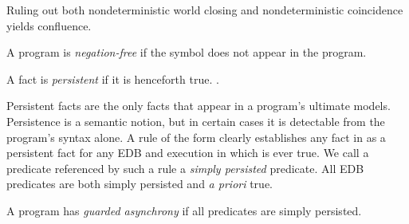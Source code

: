 
Ruling out both nondeterministic world closing and nondeterministic coincidence yields confluence.


\begin{definition}
A \lang program is {\em negation-free} if the \dedalus{!} symbol does not appear in the program.
\end{definition}

\begin{definition}

A fact is  {\em persistent} if it is henceforth true.
 .
\end{definition}

Persistent facts are the only facts that appear in a program's ultimate models.
Persistence is a semantic notion, but in certain cases it is detectable from the program's 
syntax alone.  A rule of the form  clearly establishes any fact
in  as a persistent fact for any EDB and execution in which  is ever true. 
We call a predicate referenced by such a rule
a {\em simply persisted} predicate.  All EDB predicates are both simply persisted and 
{\em a priori} true.  

\begin{definition}
A \lang program has {\em guarded asynchrony} if all  predicates are simply persisted.
\end{definition}

